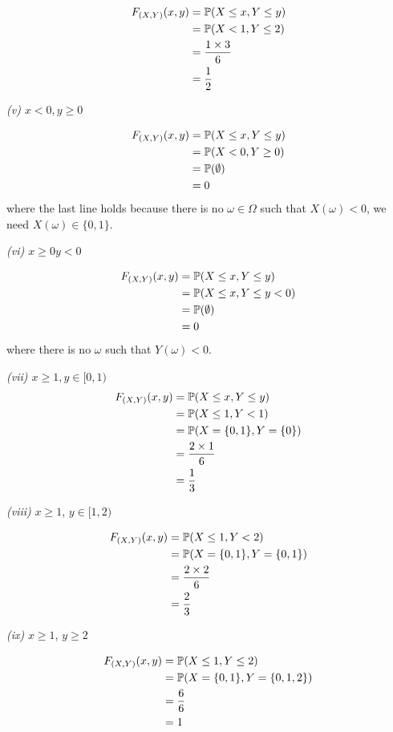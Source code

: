 \begin{align*}
    F_{(X,Y)} (x,y) &= \P( X\leq x, Y \leq y)\\
		    &= \P(X < 1, Y \leq 2)\\
		    &= \frac{1\times 3}{6} \\
		    &= \frac{1}{2} 
\end{align*}

\textit{(v) $ x < 0, y \geq 0$}

\begin{align*}
    F_{(X,Y)} (x,y) &= \P( X\leq x, Y \leq y)\\
                    &= \P(X < 0, Y \geq 0)\\
		    &= \P(\emptyset)\\
		    &= 0
\end{align*}
where the last line holds because there is no $ \omega \in \Omega$ such that $ X(\omega) < 0$,
we need $ X(\omega) \in \{ 0,1 \} $.

\textit{(vi) $ x \geq 0 y < 0$}

\begin{align*}
    F_{(X,Y)} (x,y) &= \P( X\leq x, Y \leq y)\\
		    &= \P(X \leq x, Y  \leq y < 0)\\
		    &= \P(\emptyset)\\
		    &= 0
\end{align*}
where there is no $ \omega$ such that $ Y(\omega) < 0$.


\textit{(vii) $x \geq 1, y \in [0,1) $}
\begin{align*}
    F_{(X,Y)} (x,y) &= \P( X\leq x, Y \leq y)\\
		    &= \P(X \leq 1, Y < 1)\\
		    &= \P(X = \{ 0,1 \} , Y = \{ 0 \} )\\
		    &= \frac{2 \times 1}{6} \\
		    &= \frac{1}{3} 
\end{align*}

\textit{(viii)} $ x \geq 1$, $ y \in [1,2)$
	
\begin{align*}
    F_{(X,Y)} (x,y) &= \P(X \leq 1, Y < 2)\\
		    &= \P(X = \{ 0,1 \} , Y = \{ 0,1 \} )\\
		    &= \frac{2\times 2}{6} \\
		    &= \frac{2}{3} 
\end{align*}

\textit{(ix)} $ x \geq 1$, $ y \geq 2$

\begin{align*}
    F_{(X,Y)} (x,y) &= \P(X \leq 1, Y \leq 2)\\
		    &= \P(X = \{ 0,1 \} , Y = \{ 0,1,2 \} )\\
		    &= \frac{6}{6} \\
		    &= 1
\end{align*}


 
